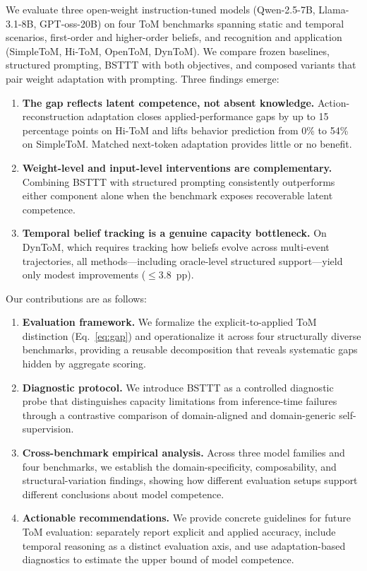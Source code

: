 \documentclass{article}
\begin{document}
We evaluate three open-weight instruction-tuned models (Qwen-2.5-7B, Llama-3.1-8B, GPT-oss-20B) on four ToM benchmarks spanning static and temporal scenarios, first-order and higher-order beliefs, and recognition and application (SimpleToM, Hi-ToM, OpenToM, DynToM).
We compare frozen baselines, structured prompting, BSTTT with both objectives, and composed variants that pair weight adaptation with prompting.
Three findings emerge:
%
\begin{enumerate}[leftmargin=*,itemsep=2pt,topsep=3pt]
    \item \textbf{The gap reflects latent competence, not absent knowledge.}
    Action-reconstruction adaptation closes applied-performance gaps by up to 15 percentage points on Hi-ToM and lifts behavior prediction from 0\% to 54\% on SimpleToM.
    Matched next-token adaptation provides little or no benefit.

    \item \textbf{Weight-level and input-level interventions are complementary.}
    Combining BSTTT with structured prompting consistently outperforms either component alone when the benchmark exposes recoverable latent competence.

    \item \textbf{Temporal belief tracking is a genuine capacity bottleneck.}
    On DynToM, which requires tracking how beliefs evolve across multi-event trajectories, all methods---including oracle-level structured support---yield only modest improvements ($\leq$3.8~pp).
\end{enumerate}

Our contributions are as follows:
%
\begin{enumerate}[leftmargin=*,itemsep=2pt,topsep=3pt]
    \item \textbf{Evaluation framework.}
    We formalize the explicit-to-applied ToM distinction (Eq.~\ref{eq:gap}) and operationalize it across four structurally diverse benchmarks, providing a reusable decomposition that reveals systematic gaps hidden by aggregate scoring.

    \item \textbf{Diagnostic protocol.}
    We introduce BSTTT as a controlled diagnostic probe that distinguishes capacity limitations from inference-time failures through a contrastive comparison of domain-aligned and domain-generic self-supervision.

    \item \textbf{Cross-benchmark empirical analysis.}
    Across three model families and four benchmarks, we establish the domain-specificity, composability, and structural-variation findings, showing how different evaluation setups support different conclusions about model competence.

    \item \textbf{Actionable recommendations.}
    We provide concrete guidelines for future ToM evaluation: separately report explicit and applied accuracy, include temporal reasoning as a distinct evaluation axis, and use adaptation-based diagnostics to estimate the upper bound of model competence.
\end{enumerate}
\end{document}
